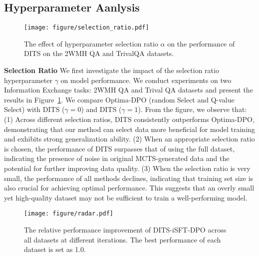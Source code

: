 


\subsection{Hyperparameter Aanlysis}
\label{subsection:selection_ratio}
\begin{figure}
    \centering
    \texttt{[image: figure/selection\_ratio.pdf]}
    \caption{The effect of hyperparameter selection ratio $\alpha$ on the performance of DITS on the 2WMH QA and TrivalQA datasets.}
    \label{fig:selection_ratio}

\end{figure}

\textbf{Selection Ratio} We first investigate the impact of the selection ratio hyperparameter $\gamma$ on model performance. We conduct experiments on two Information Exchange tasks: 2WMH QA and Trival QA datasets and present the results in Figure~\ref{fig:selection_ratio}. We compare Optima-DPO (random Select and Q-value Select) with DITS ($\gamma=0$) and DITS ($\gamma=1$). From the figure, we observe that: (1) Across different selection ratios, DITS consistently outperforms Optima-DPO, demonstrating that our method can select data more beneficial for model training and exhibits strong generalization ability. (2) When an appropriate selection ratio is chosen, the performance of DITS surpasses that of using the full dataset, indicating the presence of noise in original MCTS-generated data and the potential for further improving data quality. (3) When the selection ratio is very small, the performance of all methods declines, indicating that training set size is also crucial for achieving optimal performance. This suggests that an overly small yet high-quality dataset may not be sufficient to train a well-performing model.


\begin{figure}
    \centering
    \texttt{[image: figure/radar.pdf]}
    \caption{The relative performance improvement of DITS-iSFT-DPO across all datasets at different iterations. The best performance of each dataset is set as 1.0.} 
    \label{fig:iteration}
\end{figure}


